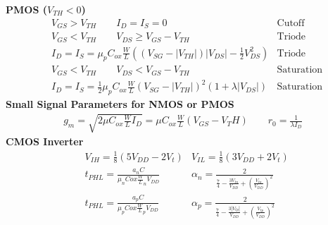 \documentclass[12pt,letterpaper]{article} \usepackage{amsmath} \usepackage{graphicx} \usepackage[margin=1in]{geometry} \usepackage{longtable}  \usepackage{amssymb}
\begin{document}
	\textbf{PMOS ($V_{TH}<0$)}
	\begin{align*}
		&V_{GS} > V_{TH} \qquad I_D = I_S = 0 &\text{Cutoff}\\
		&V_{GS} < V_{TH} \qquad V_{DS} \ge V_{GS} - V_{TH} &\text{Triode}\\
		&I_D = I_S = \mu_p C_{ox} \frac{W}{L} \left((V_{SG}-|V_{TH}|)|V_{DS}| - \frac{1}{2}V^2_{DS}\right)&\text{Triode}\\
		&V_{GS} < V_{TH} \qquad V_{DS} < V_{GS} - V_{TH}&\text{Saturation}\\
		&I_D = I_S = \frac{1}{2}\mu_p C_{ox} \frac{W}{L} (V_{SG} - |V_{TH}|)^2(1+\lambda |V_{DS}|)&\text{Saturation}
	\end{align*}
	\textbf{Small Signal Parameters for NMOS or PMOS}
	\begin{align*}
		g_m = \sqrt{2\mu C_{ox} \frac{W}{L}I_D} = \mu C_{ox} \frac{W}{L} (V_{GS} - V_TH) \qquad r_0 = \frac{1}{\lambda I_D}
	\end{align*}
	\textbf{CMOS Inverter}
	\begin{align*}
		&V_{IH} = \frac{1}{8} (5V_{DD} - 2V_t)  &V_{IL} = \frac{1}{8} (3V_{DD} + 2V_t)		\\
		&t_{PHL} = \frac{a_n C}{\mu_n C{ox}\frac{W}{L}_n V_{DD}}& \alpha_n = \frac{2}{\frac{7}{4}-\frac{3V_{tn}}{V_{DD}}+\left(\frac{V_{tn}}{V_{DD}}\right)^2}\\
		&t_{PHL} = \frac{a_p C}{\mu_p C{ox}\frac{W}{L}_p V_{DD}}& \alpha_p = \frac{2}{\frac{7}{4}-\frac{3|V_{tp}|}{V_{DD}}+\left(\frac{V_{tp}}{V_{DD}}\right)^2}
	\end{align*}
	
	
	
	
	
\end{document}
